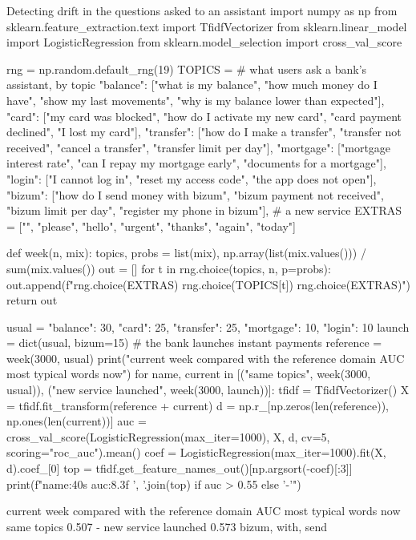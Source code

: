 \begin{pylisting}[label={lst:querydrift}]{Detecting drift in the questions asked to an assistant}
import numpy as np
from sklearn.feature_extraction.text import TfidfVectorizer
from sklearn.linear_model import LogisticRegression
from sklearn.model_selection import cross_val_score

rng = np.random.default_rng(19)
TOPICS = {   # what users ask a bank's assistant, by topic
 "balance": ["what is my balance", "how much money do I have", "show my last movements",
             "why is my balance lower than expected"],
 "card": ["my card was blocked", "how do I activate my new card", "card payment declined",
          "I lost my card"],
 "transfer": ["how do I make a transfer", "transfer not received", "cancel a transfer",
              "transfer limit per day"],
 "mortgage": ["mortgage interest rate", "can I repay my mortgage early",
              "documents for a mortgage"],
 "login": ["I cannot log in", "reset my access code", "the app does not open"],
 "bizum": ["how do I send money with bizum", "bizum payment not received",
           "bizum limit per day", "register my phone in bizum"],   # a new service
}
EXTRAS = ["", "please", "hello", "urgent", "thanks", "again", "today"]

def week(n, mix):
    topics, probs = list(mix), np.array(list(mix.values())) / sum(mix.values())
    out = []
    for t in rng.choice(topics, n, p=probs):
        out.append(f"{rng.choice(EXTRAS)} {rng.choice(TOPICS[t])} {rng.choice(EXTRAS)}")
    return out

usual = {"balance": 30, "card": 25, "transfer": 25, "mortgage": 10, "login": 10}
launch = dict(usual, bizum=15)                 # the bank launches instant payments
reference = week(3000, usual)
print("current week compared with the reference   domain AUC   most typical words now")
for name, current in [("same topics", week(3000, usual)),
                      ("new service launched", week(3000, launch))]:
    tfidf = TfidfVectorizer()
    X = tfidf.fit_transform(reference + current)
    d = np.r_[np.zeros(len(reference)), np.ones(len(current))]
    auc = cross_val_score(LogisticRegression(max_iter=1000), X, d, cv=5,
                          scoring="roc_auc").mean()
    coef = LogisticRegression(max_iter=1000).fit(X, d).coef_[0]
    top = tfidf.get_feature_names_out()[np.argsort(-coef)[:3]]
    print(f"{name:40s}   {auc:8.3f}     {', '.join(top) if auc > 0.55 else '-'}")
\end{pylisting}
\begin{pyoutput}
current week compared with the reference   domain AUC   most typical words now
same topics                                   0.507     -
new service launched                          0.573     bizum, with, send
\end{pyoutput}


